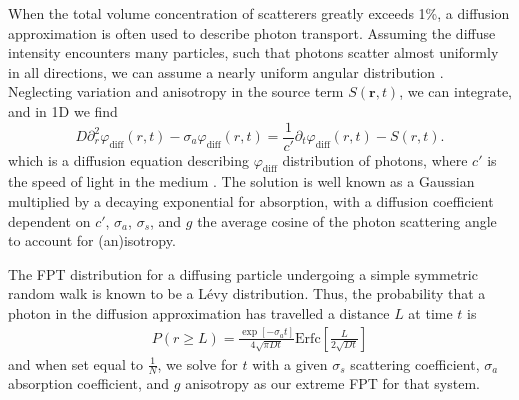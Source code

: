 \documentclass[floatfix,aps,prl,reprint,groupedaddress]{revtex4-2}
\begin{document}
When the total volume concentration of scatterers greatly exceeds 1\%, a diffusion approximation is often used to describe photon transport. Assuming the diffuse intensity encounters many particles, such that photons scatter almost uniformly in all directions, we can assume a nearly uniform angular distribution \cite{ishimaru_wave_nodate,bohren_absorption_1983}. Neglecting variation and anisotropy in the source term $S\left(\mathbf{r},t\right)$, we can integrate, and in 1D we find
\begin{equation}
    D \partial_{r}^{2} \varphi_{\textrm{diff}} \left(r,t\right) - \sigma_{a} \varphi_{\textrm{diff}} \left(r,t\right) = \frac{1}{c'} \partial_{t} \varphi_{\textrm{diff}} \left(r,t\right) - S \left(r,t\right).
\end{equation}
which is a diffusion equation describing $\varphi_{\textrm{diff}}$ distribution of photons, where $c'$ is the speed of light in the medium \cite{haskell_boundary_1994}. The solution is well known as
a Gaussian multiplied by a decaying exponential for absorption, with a diffusion coefficient dependent on $c'$, $\sigma_{a}$, $\sigma_{s}$, and $g$ the average cosine of the photon scattering angle to account for (an)isotropy.

The FPT distribution for a diffusing particle undergoing a simple symmetric random walk is known to be a Lévy distribution. Thus, the probability that a photon in the diffusion approximation has travelled a distance $L$ at time $t$ is
\begin{align}
     P\left(r \geq L\right) = \frac{\exp\left[{-\sigma_{a} t}\right]}{4 \sqrt{\pi D t}}\textrm{Erfc}\left[{\frac{L}{2 \sqrt{D t}}}\right] \label{FPT_diff}
\end{align}
and when set equal to $\frac{1}{N}$, we solve for $t$ with a given $\sigma_{s}$ scattering coefficient, $\sigma_{a}$ absorption coefficient, and $g$ anisotropy as our extreme FPT for that system.
\end{document}
